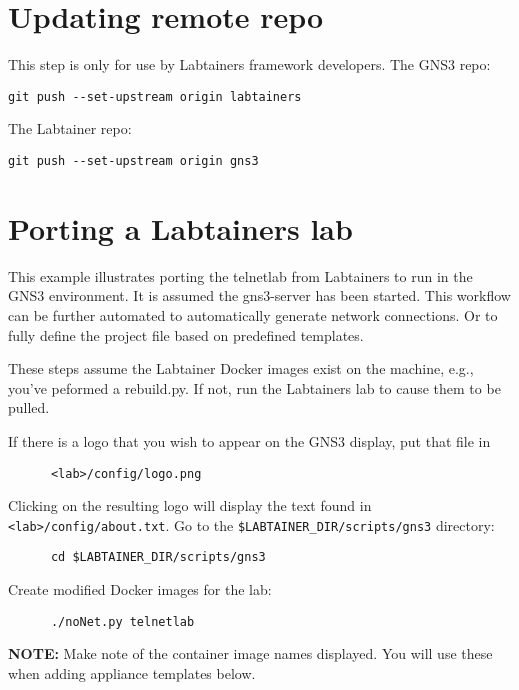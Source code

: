 \documentclass[12pt]{article}
\begin{document}
\section{Updating remote repo}
This step is only for use by Labtainers framework developers.
The GNS3 repo:
\begin{verbatim}
git push --set-upstream origin labtainers
\end{verbatim}

\noindent The Labtainer repo:
\begin{verbatim}
git push --set-upstream origin gns3
\end{verbatim}


\section{Porting a Labtainers lab}
This example illustrates porting the telnetlab from Labtainers to run in the GNS3 environment.
It is assumed the gns3-server has been started.
This workflow can be further automated to automatically generate network connections.  Or to fully define the project
file based on predefined templates.

These steps assume the Labtainer Docker images exist on the machine, e.g., you've peformed a rebuild.py.  If not, run the Labtainers lab
to cause them to be pulled. 

\bigskip
If there is a logo that you wish to appear on the GNS3 display, put that file in 
\begin{verbatim}
      <lab>/config/logo.png
\end{verbatim}

\noindent Clicking on the resulting logo will display the text found in {\tt <lab>/config/about.txt}.
\bigskip
Go to the {\tt \$LABTAINER\_DIR/scripts/gns3} directory:
\begin{verbatim}
      cd $LABTAINER_DIR/scripts/gns3
\end{verbatim}

Create modified Docker images for the lab:
\begin{verbatim}
      ./noNet.py telnetlab
\end{verbatim}
\noindent \textbf{NOTE:} Make note of the container image names displayed.  You will use these when adding appliance templates below.
\end{document}
